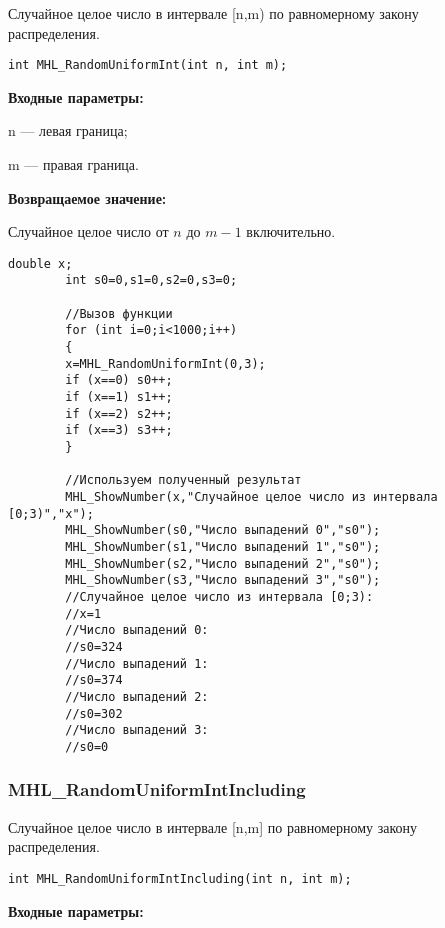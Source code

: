 \documentclass[a4paper,12pt]{article}
\begin{document}
Случайное целое число в интервале [n,m) по равномерному закону распределения.


\begin{lstlisting}[label=code_syntax_MHL_RandomUniformInt,caption=Синтаксис]
int MHL_RandomUniformInt(int n, int m);
\end{lstlisting}

\textbf{Входные параметры:}

n --- левая граница;

 m --- правая граница.

\textbf{Возвращаемое значение:}

Случайное целое число от $n$ до $m-1$ включительно.


\begin{lstlisting}[label=code_use_MHL_RandomUniformInt,caption=Пример использования]
        double x;
        int s0=0,s1=0,s2=0,s3=0;

        //Вызов функции
        for (int i=0;i<1000;i++)
        {
        x=MHL_RandomUniformInt(0,3);
        if (x==0) s0++;
        if (x==1) s1++;
        if (x==2) s2++;
        if (x==3) s3++;
        }

        //Используем полученный результат
        MHL_ShowNumber(x,"Случайное целое число из интервала [0;3)","x");
        MHL_ShowNumber(s0,"Число выпадений 0","s0");
        MHL_ShowNumber(s1,"Число выпадений 1","s0");
        MHL_ShowNumber(s2,"Число выпадений 2","s0");
        MHL_ShowNumber(s3,"Число выпадений 3","s0");
        //Случайное целое число из интервала [0;3):
        //x=1
        //Число выпадений 0:
        //s0=324
        //Число выпадений 1:
        //s0=374
        //Число выпадений 2:
        //s0=302
        //Число выпадений 3:
        //s0=0
\end{lstlisting}

\subsubsection{MHL\_RandomUniformIntIncluding}\label{MHL_RandomUniformIntIncluding}

Случайное целое число в интервале [n,m] по равномерному закону распределения.


\begin{lstlisting}[label=code_syntax_MHL_RandomUniformIntIncluding,caption=Синтаксис]
int MHL_RandomUniformIntIncluding(int n, int m);
\end{lstlisting}

\textbf{Входные параметры:}
\end{document}
